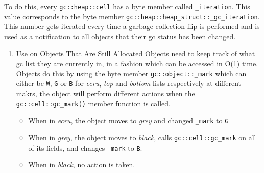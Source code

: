 \documentclass[11pt]{article}
\begin{document}
To do this, every \texttt{gc::heap::cell} has a byte member called \texttt{\_iteration}.
This value corresponds to the byte member \texttt{gc::heap::heap\_struct::\_gc\_iteration}. This number gets iterated every time a garbage collection
flip is performed and is used as a notification to all objects that their gc status has been changed.
\begin{enumerate}
\item Use on Objects That Are Still Allocated
\label{sec:org8d208fb}
Objects need to keep track of what gc list they are currently in, in a fashion which can be accessed in O(1) time. Objects
do this by using the byte member \texttt{gc::object::\_mark} which can either be \texttt{W}, \texttt{G} or \texttt{B} for \emph{ecru}, \emph{top} and \emph{bottom} lists respectively
at different makrs, the object will perform different actions when the \texttt{gc::cell::gc\_mark()} member function is called.
\begin{itemize}
\item When in \emph{ecru}, the object moves to \emph{grey} and changed \texttt{\_mark} to \texttt{G}
\item When in \emph{grey}, the object moves to \emph{black}, calls \texttt{gc::cell::gc\_mark} on all of its fields, and changes \texttt{\_mark} to \texttt{B}.
\item When in \emph{black}, no action is taken.
\end{itemize}


\end{enumerate}
\end{document}
